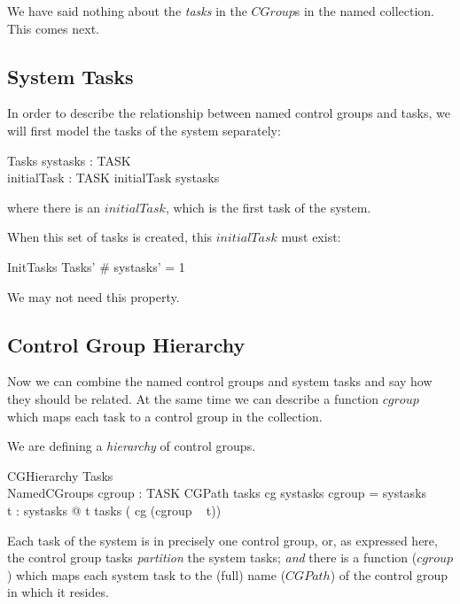 \documentclass[a4paper,twoside,12pt]{article}
\begin{document}
We have said nothing about the \emph{tasks} in the $CGroup$s in the named collection.
This comes next.

\subsection{System Tasks}
In order to describe the relationship between named control groups and tasks, we will first model the tasks of the system separately:

\begin{schema}{Tasks}
systasks : \finset TASK \\
initialTask : TASK
\where
initialTask \in systasks
\end{schema}
where there is an $initialTask$, which is the first task of the system.

When this set of tasks is created, this $initialTask$ must exist:

\begin{schema}{InitTasks}
Tasks'
\where
\# systasks' = 1
\end{schema}
We may not need this property.

\subsection{Control Group Hierarchy}
Now we can combine the named control groups and system tasks and say how they should be related. At the same time we can describe a function $cgroup$ which maps each task to a control group in the collection.

We are defining a \emph{hierarchy} of control groups.

\begin{schema}{CGHierarchy}
Tasks \\
NamedCGroups
\also
cgroup : TASK \ffun CGPath
\where
tasks \circ cg \partition systasks
\also
\dom cgroup = systasks \\
\forall t : systasks @ t \in tasks ( cg (cgroup ~ t))
\end{schema}
Each task of the system is in precisely one control group, or, as expressed here, the control group tasks \emph{partition} the system tasks; \emph{and} there is a function ($cgroup$) which maps each system task to the (full) name ($CGPath$) of the control group in which it resides.
\end{document}
